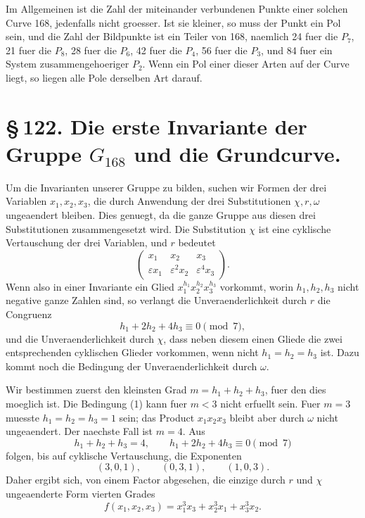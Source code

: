 \documentclass[11pt]{article}
\newcommand{\eps}{\varepsilon}
\newcommand{\mat}[1]{\begin{pmatrix}#1\end{pmatrix}}
\begin{document}
Im Allgemeinen ist die Zahl der miteinander verbundenen Punkte einer solchen Curve 168, jedenfalls nicht groesser. Ist sie kleiner, so muss der Punkt ein Pol sein, und die Zahl der Bildpunkte ist ein Teiler von 168, naemlich 24 fuer die \(P_7\), 21 fuer die \(P_8\), 28 fuer die \(P_6\), 42 fuer die \(P_4\), 56 fuer die \(P_3\), und 84 fuer ein System zusammengehoeriger \(P_2\). Wenn ein Pol einer dieser Arten auf der Curve liegt, so liegen alle Pole derselben Art darauf.

\section*{\S\,122. Die erste Invariante der Gruppe \(G_{168}\) und die Grundcurve.}

Um die Invarianten unserer Gruppe zu bilden, suchen wir Formen der drei Variablen \(x_1,x_2,x_3\), die durch Anwendung der drei Substitutionen \(\chi,r,\omega\) ungeaendert bleiben. Dies genuegt, da die ganze Gruppe aus diesen drei Substitutionen zusammengesetzt wird. Die Substitution \(\chi\) ist eine cyklische Vertauschung der drei Variablen, und \(r\) bedeutet
\begin{equation}
\mat{x_1&x_2&x_3\\ \eps x_1&\eps^2x_2&\eps^4x_3}.
\end{equation}
Wenn also in einer Invariante ein Glied \(x_1^{h_1}x_2^{h_2}x_3^{h_3}\) vorkommt, worin \(h_1,h_2,h_3\) nicht negative ganze Zahlen sind, so verlangt die Unveraenderlichkeit durch \(r\) die Congruenz
\begin{equation}
h_1+2h_2+4h_3\equiv0\pmod 7,
\tag{1}
\end{equation}
und die Unveraenderlichkeit durch \(\chi\), dass neben diesem einen Gliede die zwei entsprechenden cyklischen Glieder vorkommen, wenn nicht \(h_1=h_2=h_3\) ist. Dazu kommt noch die Bedingung der Unveraenderlichkeit durch \(\omega\).

Wir bestimmen zuerst den kleinsten Grad \(m=h_1+h_2+h_3\), fuer den dies moeglich ist. Die Bedingung (1) kann fuer \(m<3\) nicht erfuellt sein. Fuer \(m=3\) muesste \(h_1=h_2=h_3=1\) sein; das Product \(x_1x_2x_3\) bleibt aber durch \(\omega\) nicht ungeaendert. Der naechste Fall ist \(m=4\). Aus
\begin{equation}
h_1+h_2+h_3=4,
\qquad
h_1+2h_2+4h_3\equiv0\pmod 7
\end{equation}
folgen, bis auf cyklische Vertauschung, die Exponenten
\begin{equation}
(3,0,1),\qquad (0,3,1),\qquad (1,0,3).
\end{equation}
Daher ergibt sich, von einem Factor abgesehen, die einzige durch \(r\) und \(\chi\) ungeaenderte Form vierten Grades
\begin{equation}
f(x_1,x_2,x_3)=x_1^3x_3+x_2^3x_1+x_3^3x_2.
\tag{2}
\end{equation}
\end{document}
